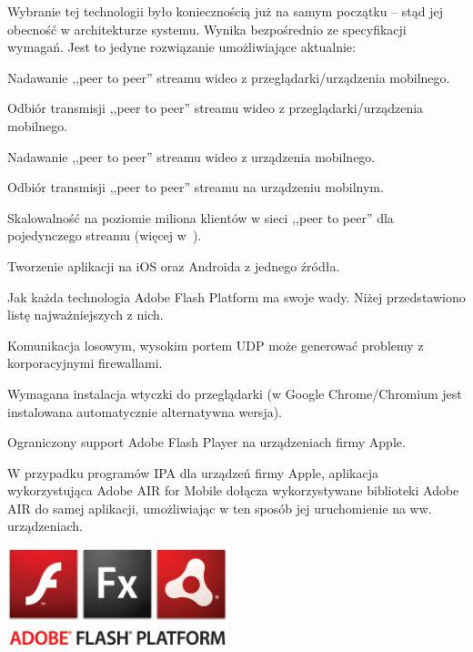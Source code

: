 Wybranie tej technologii było koniecznością już na samym początku -- stąd jej obecność w architekturze systemu. Wynika bezpośrednio ze specyfikacji wymagań. Jest to jedyne rozwiązanie umożliwiające aktualnie:
\begin{packed_item}
    \item{Nadawanie ,,peer to peer'' streamu wideo z przeglądarki/urządzenia mobilnego.}
    \item{Odbiór transmisji ,,peer to peer'' streamu wideo z przeglądarki/urządzenia mobilnego.}
    \item{Nadawanie ,,peer to peer'' streamu wideo z urządzenia mobilnego.}
    \item{Odbiór transmisji ,,peer to peer'' streamu na urządzeniu mobilnym.}
    \item{Skalowalność na poziomie miliona klientów w sieci ,,peer to peer'' dla pojedynczego streamu (więcej w~\cite{MattKauf2009}).}
    \item{Tworzenie aplikacji na iOS oraz Androida z jednego źródła.}
\end{packed_item}

Jak każda technologia Adobe Flash Platform ma swoje wady. Niżej przedstawiono listę najważniejszych z nich.
\begin{packed_item}
    \item{Komunikacja losowym, wysokim portem UDP może generować problemy z korporacyjnymi firewallami.}
    \item{Wymagana instalacja wtyczki do przeglądarki (w Google Chrome/Chromium jest instalowana automatycznie alternatywna wersja).}
    \item{Ograniczony support Adobe Flash Player na urządzeniach firmy Apple.}
    \item{W przypadku programów IPA dla urządzeń firmy Apple, aplikacja wykorzystująca Adobe AIR for Mobile dołącza wykorzystywane biblioteki Adobe AIR do samej aplikacji, umożliwiając w ten sposób jej uruchomienie na ww. urządzeniach.}
\end{packed_item}

\begin{center}
    \includegraphics[width=0.48\textwidth]{img/logos/adobe-flash-platform.jpg}
\end{center}


